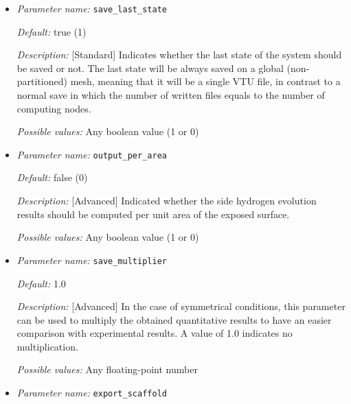 \begin{itemize}
{\it Description:} [Standard] The interval of saving results, text and VTK (if selected), to disk.

{\it Possible values:} Any floating-point number


\item {\it Parameter name:} {\tt save\_last\_state}
\label{parameters:save_last_state}


{\it Default:} true (1)

{\it Description:} [Standard] Indicates whether the last state of the system should be saved or not. The last state will be always saved on a global (non-partitioned) mesh, meaning that it will be a single VTU file, in contrast to a normal save in which the number of written files equals to the number of computing nodes.

{\it Possible values:} Any boolean value (1 or 0)


\item {\it Parameter name:} {\tt output\_per\_area}
\label{parameters:output_per_area}


{\it Default:} false (0)

{\it Description:} [Advanced] Indicated whether the side hydrogen evolution results should be computed per unit area of the exposed surface.

{\it Possible values:} Any boolean value (1 or 0)


\item {\it Parameter name:} {\tt save\_multiplier}
\label{parameters:save_multiplier}


{\it Default:} 1.0

{\it Description:} [Advanced] In the case of symmetrical conditions, this parameter can be used to multiply the obtained quantitative results to have an easier comparison with experimental results. A value of 1.0 indicates no multiplication.

{\it Possible values:} Any floating-point number


\item {\it Parameter name:} {\tt export\_scaffold}
\label{parameters:export_scaffold}


\end{itemize}
